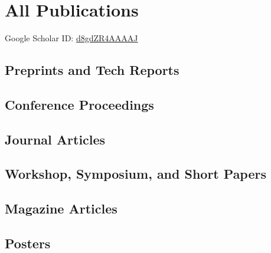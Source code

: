 \documentclass[11pt,letter,sans]{moderncv}
\begin{document}
\newpage
\section{All Publications}
\vspace{-6mm}
\hfill
Google Scholar ID:
\href{https://scholar.google.com/citations?user=d8gdZR4AAAAJ}{d8gdZR4AAAAJ}
\vspace{2mm}

\renewcommand*{\bibfont}{\small}

\subsection{Preprints and Tech Reports}
\begin{refsection}
\nocite{*}
\printbibliography[heading=none,prefixnumbers=P]
\end{refsection}
\subsection{Conference Proceedings}
\begin{refsection}
\nocite{*}
\printbibliography[heading=none,prefixnumbers=C]
\end{refsection}
\subsection{Journal Articles}
\begin{refsection}
\nocite{*}
\printbibliography[heading=none,prefixnumbers=J]
\end{refsection}
\subsection{Workshop, Symposium, and Short Papers}
\begin{refsection}
\nocite{*}
\printbibliography[heading=none,prefixnumbers=W]
\end{refsection}
\subsection{Magazine Articles}
\begin{refsection}
\nocite{*}
\printbibliography[heading=none,prefixnumbers=M]
\end{refsection}
\subsection{Posters}
\begin{refsection}
\nocite{*}
\printbibliography[heading=none,prefixnumbers=S]
\end{refsection}
\end{document}
